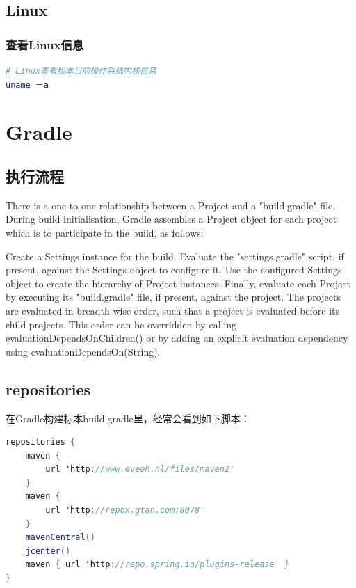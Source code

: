 \documentclass[letter]{book}
\begin{document}
\subsection{Linux}

\subsubsection{查看Linux信息}

\begin{lstlisting}[language=Bash]
# Linux查看版本当前操作系统内核信息
uname －a 
\end{lstlisting}


\section*{Gradle}

\subsection{执行流程}

There is a one-to-one relationship between a Project and a "build.gradle" file. During build initialisation, Gradle assembles a Project object for each project which is to participate in the build, as follows:

Create a Settings instance for the build.
Evaluate the "settings.gradle" script, if present, against the Settings object to configure it.
Use the configured Settings object to create the hierarchy of Project instances.
Finally, evaluate each Project by executing its "build.gradle" file, if present, against the project. The projects are evaluated in breadth-wise order, such that a project is evaluated before its child projects. This order can be overridden by calling evaluationDependsOnChildren() or by adding an explicit evaluation dependency using evaluationDependsOn(String).

\subsection{repositories}

在Gradle构建标本build.gradle里，经常会看到如下脚本：

\begin{lstlisting}[language=Java]
repositories {
	maven {
		url 'http://www.eveoh.nl/files/maven2'
	}
	maven {
		url 'http://repox.gtan.com:8078'
	}
	mavenCentral()
	jcenter()
	maven { url 'http://repo.spring.io/plugins-release' }
}
\end{lstlisting}
\end{document}
